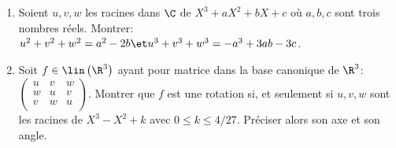 \begin{enonce}
\begin{exercise}[ID={RMS 125 E834, 2014 Centrale PSI},subtitle={2014 Centrale PSI},tags={}, difficulty={0}]
\begin{enumerate}
  \item Soient $u,v,w$ les racines dans $\C$ de $X^3+aX^2+bX+c$ où $a,b,c$ sont trois nombres réels.
    Montrer: 
    $u^2+v^2+w^2=a^2-2b \et u^3+v^3+w^3=-a^3+3ab-3c$.

  \item Soit $f\in\lin\left( \R^3\right)$ ayant pour matrice dans la base canonique de $\R^3$:
    $\begin{pmatrix} u & v & w \\ w & u & v \\ v & w & u \\ \end{pmatrix}$.
    Montrer que $f$ est une rotation si, et seulement si $u,v,w$ sont les racines de $X^3-X^2+k$ avec $0\leq k\leq 4/27$.
    Préciser alors son axe et son angle.
\end{enumerate}
\end{exercise}
\begin{solution}
\end{solution}
\end{enonce}
